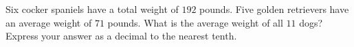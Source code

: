 Six cocker spaniels have a total weight of $192$ pounds. Five golden retrievers have an average weight of $71$ pounds. What is the average weight of all $11$ dogs? Express your answer as a decimal to the nearest tenth.
